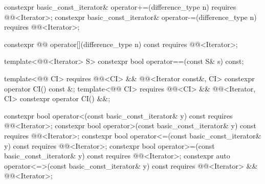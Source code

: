 \begin{codeblock}
{{    constexpr basic_const_iterator& operator+=(difference_type n)
      requires @@<Iterator>;
    constexpr basic_const_iterator& operator-=(difference_type n)
      requires @@<Iterator>;

    constexpr @@ operator[](difference_type n) const
      requires @@<Iterator>;

    template<@@<Iterator> S>
      constexpr bool operator==(const S& s) const;

    template<@@ CI>
      requires @@<CI> && @@<Iterator const&, CI>
    constexpr operator CI() const &;
    template<@@ CI>
      requires @@<CI> && @@<Iterator, CI>
    constexpr operator CI() &&;

    constexpr bool operator<(const basic_const_iterator& y) const
      requires @@<Iterator>;
    constexpr bool operator>(const basic_const_iterator& y) const
      requires @@<Iterator>;
    constexpr bool operator<=(const basic_const_iterator& y) const
      requires @@<Iterator>;
    constexpr bool operator>=(const basic_const_iterator& y) const
      requires @@<Iterator>;
    constexpr auto operator<=>(const basic_const_iterator& y) const
      requires @@<Iterator> && @@<Iterator>;

}}
\end{codeblock}
